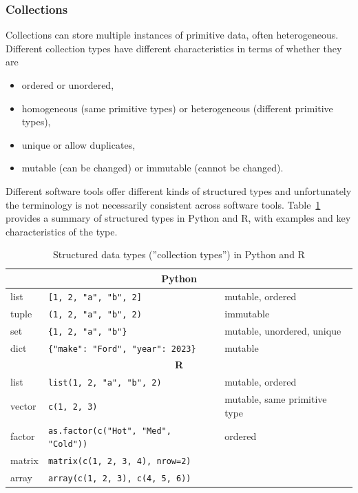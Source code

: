 \subsubsection*{Collections}

Collections can store multiple instances of primitive data, often heterogeneous. Different collection types have different characteristics in terms of whether they are 

\begin{itemize}
\item ordered or unordered, 
\item homogeneous (same primitive types) or heterogeneous (different primitive types), 
\item unique or allow duplicates, 
\item mutable (can be changed) or immutable (cannot be changed). 
\end{itemize}

Different software tools offer different kinds of structured types and unfortunately the terminology is not necessarily consistent across software tools. Table~\ref{tab:structured} provides a summary of structured types in Python and R, with examples and key characteristics of the type.

\begin{table}
\renewcommand{\arraystretch}{1.25}
\footnotesize
\centering

\begin{tabular}{l|l|l} \hline
\multicolumn{3}{c}{\textbf{Python}} \\ \hline
list\index{List (in Python)} & \texttt{[1, 2, "a", "b", 2]} & mutable, ordered \\
tuple\index{Tuple (in Python)} & \texttt{(1, 2, "a", "b", 2)} & immutable \\
set\index{Set (in Python)} & \texttt{\{1, 2, "a", "b"\}} &  mutable, unordered, unique \\
dict\index{Dictionary (in Python)} & \texttt{\{"make": "Ford", "year": 2023\}} & mutable \\ \hline
\multicolumn{3}{c}{\textbf{R}} \\ \hline 
list\index{List (in R)} & \texttt{list(1, 2, "a", "b", 2)} & mutable, ordered \\
vector\index{Vector (in R)} & \texttt{c(1, 2, 3)} & mutable, same primitive type \\
factor\index{Factor (in R)} & \texttt{as.factor(c("Hot", "Med", "Cold"))} & ordered\\
matrix\index{Matrix (in R)} & \texttt{matrix(c(1, 2, 3, 4), nrow=2)} & \\
array\index{Array (in R)} & \texttt{array(c(1, 2, 3), c(4, 5, 6))} \\ \hline
\end{tabular}
\caption{Structured data types (''collection types'') in Python and R}
\label{tab:structured}
\end{table}

